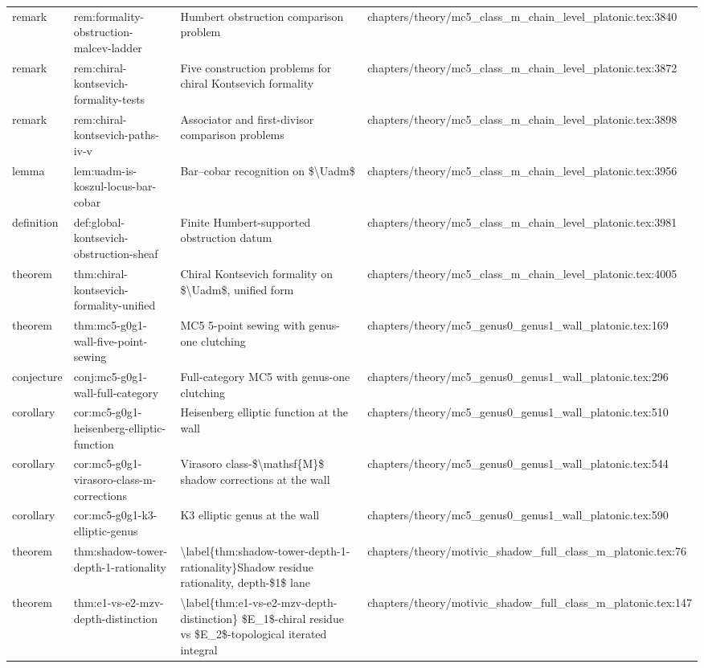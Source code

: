 \documentclass[11pt]{article}
\begin{document}
\begin{longtable}{L{0.10\textwidth}L{0.26\textwidth}L{0.42\textwidth}L{0.22\textwidth}}
remark & rem:formality-obstruction-malcev-ladder & Humbert obstruction comparison problem & chapters/theory/mc5\_class\_m\_chain\_level\_platonic.tex:3840\\
remark & rem:chiral-kontsevich-formality-tests & Five construction problems for chiral Kontsevich formality & chapters/theory/mc5\_class\_m\_chain\_level\_platonic.tex:3872\\
remark & rem:chiral-kontsevich-paths-iv-v & Associator and first-divisor comparison problems & chapters/theory/mc5\_class\_m\_chain\_level\_platonic.tex:3898\\
lemma & lem:uadm-is-koszul-locus-bar-cobar & Bar--cobar recognition on \$\textbackslash{}Uadm\$ & chapters/theory/mc5\_class\_m\_chain\_level\_platonic.tex:3956\\
definition & def:global-kontsevich-obstruction-sheaf & Finite Humbert-supported obstruction datum & chapters/theory/mc5\_class\_m\_chain\_level\_platonic.tex:3981\\
theorem & thm:chiral-kontsevich-formality-unified & Chiral Kontsevich formality on \$\textbackslash{}Uadm\$, unified form & chapters/theory/mc5\_class\_m\_chain\_level\_platonic.tex:4005\\
theorem & thm:mc5-g0g1-wall-five-point-sewing & MC5 5-point sewing with genus-one clutching & chapters/theory/mc5\_genus0\_genus1\_wall\_platonic.tex:169\\
conjecture & conj:mc5-g0g1-wall-full-category & Full-category MC5 with genus-one clutching & chapters/theory/mc5\_genus0\_genus1\_wall\_platonic.tex:296\\
corollary & cor:mc5-g0g1-heisenberg-elliptic-function & Heisenberg elliptic function at the wall & chapters/theory/mc5\_genus0\_genus1\_wall\_platonic.tex:510\\
corollary & cor:mc5-g0g1-virasoro-class-m-corrections & Virasoro class-\$\textbackslash{}mathsf\{M\}\$ shadow corrections at the wall & chapters/theory/mc5\_genus0\_genus1\_wall\_platonic.tex:544\\
corollary & cor:mc5-g0g1-k3-elliptic-genus & K3 elliptic genus at the wall & chapters/theory/mc5\_genus0\_genus1\_wall\_platonic.tex:590\\
theorem & thm:shadow-tower-depth-1-rationality & \textbackslash{}label\{thm:shadow-tower-depth-1-rationality\}Shadow residue rationality, depth-\$1\$ lane & chapters/theory/motivic\_shadow\_full\_class\_m\_platonic.tex:76\\
theorem & thm:e1-vs-e2-mzv-depth-distinction & \textbackslash{}label\{thm:e1-vs-e2-mzv-depth-distinction\} \$E\_1\$-chiral residue vs \$E\_2\$-topological iterated integral & chapters/theory/motivic\_shadow\_full\_class\_m\_platonic.tex:147\\

\end{longtable}
\end{document}
